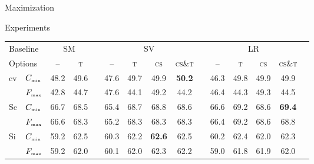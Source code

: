 \documentclass[12pt]{beamer}
\begin{document}
\begin{frame}{Maximization}
	\begin{block}{Experiments}
		\newcommand{\Cm}{$C_{\text{\tiny min}}$}
		\newcommand{\Fm}{$F_{\text{\tiny max}}$}
		\begin{table}
			\centering
			\setlength{\tabcolsep}{2.5pt}
			\begin{tabular}{l@{\ }c*{13}{c}}
				\toprule
				\multicolumn{2}{l}{Baseline}
				                                        & \multicolumn{2}{c}{SM} &      & \multicolumn{4}{c}{SV}                                      &               & \multicolumn{4}{c}{LR}                                                      \\
				\cmidrule(lr){3-4} \cmidrule(lr){6-9} \cmidrule(lr){11-14}
				\multicolumn{2}{l}{Options}
				                                        & --  & \scshape t       &      & -- & \scshape t & \scshape cs & \scshape cs{\scriptsize\&}t &               & -- & \scshape t & \scshape cs & \scshape cs{\scriptsize\&}t                 \\
				\midrule
				\multicolumn{1}{l}{\multirow{2}{*}{cv}} & \Cm & 48.2             & 49.6 &    & 47.6       & 49.7        & 49.9                        & \textbf{50.2} &    & 46.3       & 49.8        & 49.9                        & 49.9          \\
				\multicolumn{1}{l}{}                    & \Fm & 42.8             & 44.7 &    & 47.6       & 44.1        & 49.2                        & 44.2          &    & 46.4       & 44.3        & 49.3                        & 44.5          \\
				\hline
				\multicolumn{1}{l}{\multirow{2}{*}{Sc}} & \Cm & 66.7             & 68.5 &    & 65.4       & 68.7        & 68.8                        & 68.6          &    & 66.6       & 69.2        & 68.6                        & \textbf{69.4} \\
				\multicolumn{1}{l}{}                    & \Fm & 66.6             & 68.3 &    & 65.2       & 68.3        & 68.3                        & 68.3          &    & 66.4       & 69.2        & 68.6                        & 68.8          \\
				\hline
				\multicolumn{1}{l}{\multirow{2}{*}{Si}} & \Cm & 59.2             & 62.5 &    & 60.3       & 62.2        & \textbf{62.6}               & 62.5          &    & 60.2       & 62.4        & 62.0                        & 62.3          \\
				\multicolumn{1}{l}{}                    & \Fm & 59.2             & 62.0 &    & 60.1       & 62.0        & 62.3                        & 62.2          &    & 59.0       & 61.8        & 61.9                        & 62.0          \\

\end{tabular}
\end{table}
\end{block}
\end{frame}
\end{document}
